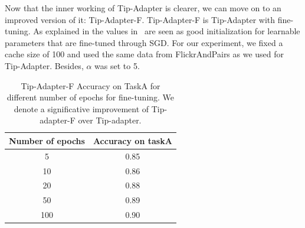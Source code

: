 \documentclass[12pt,a4paper]{article}
\begin{document}
Now that the inner working of Tip-Adapter is clearer, we can move on to an improved version of it: Tip-Adapter-F. Tip-Adapter-F is Tip-Adapter with fine-tuning. As explained in \autocite*{zhangTipAdapterTrainingfreeAdaption2022} the values in \ft\ are seen as good initialization for learnable parameters that are fine-tuned through SGD. For our experiment, we fixed a cache size of 100 and used the same data from FlickrAndPairs as we used for Tip-Adapter. Besides, $\alpha$ was set to 5.

\begin{table}[H]
    \centering
    \begin{tabular}{|c|c|}
    \hline
    \textbf{Number of epochs} & \textbf{Accuracy on taskA} \\ \hline
    5   & 0.85 \\ \hline
    10  & 0.86 \\ \hline
    20  & 0.88 \\ \hline
    50  & 0.89 \\ \hline
    100 & 0.90 \\ \hline
    \end{tabular}
    \caption{Tip-Adapter-F Accuracy on TaskA for different number of epochs for fine-tuning. We denote a significative improvement of Tip-adapter-F over Tip-adapter.}
\end{table}
\end{document}

